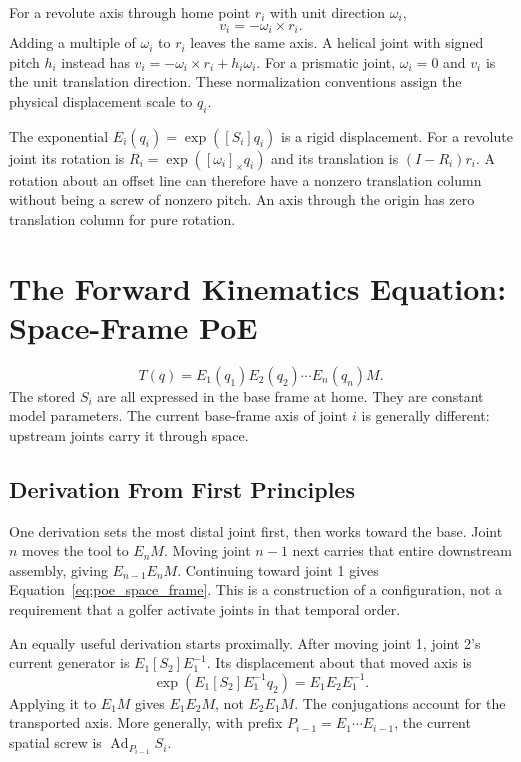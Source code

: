 For a revolute axis through home point $r_i$ with unit direction $\omega_i$,
\begin{equation}
 v_i=-\omega_i\times r_i.
\end{equation}
Adding a multiple of $\omega_i$ to $r_i$ leaves the same axis. A helical joint with signed pitch $h_i$ instead has $v_i=-\omega_i\times r_i+h_i\omega_i$. For a prismatic joint, $\omega_i=0$ and $v_i$ is the unit translation direction. These normalization conventions assign the physical displacement scale to $q_i$.

The exponential $E_i(q_i)=\exp([S_i]q_i)$ is a rigid displacement. For a revolute joint its rotation is $R_i=\exp([\omega_i]_\times q_i)$ and its translation is $(I-R_i)r_i$. A rotation about an offset line can therefore have a nonzero translation column without being a screw of nonzero pitch. An axis through the origin has zero translation column for pure rotation.

\section[The Forward Kinematics Equation: Space-Frame PoE]{The Forward Kinematics Equation:\\Space-Frame PoE}
\label{sec:poe_formula}
\begin{equation}
 \label{eq:poe_space_frame}
 T(q)=E_1(q_1)E_2(q_2)\cdots E_n(q_n)M.
\end{equation}
The stored $S_i$ are all expressed in the base frame at home. They are constant model parameters. The current base-frame axis of joint $i$ is generally different: upstream joints carry it through space.

\subsection{Derivation From First Principles}
\label{subsec:poe_derivation}

One derivation sets the most distal joint first, then works toward the base. Joint $n$ moves the tool to $E_nM$. Moving joint $n-1$ next carries that entire downstream assembly, giving $E_{n-1}E_nM$. Continuing toward joint 1 gives Equation~\ref{eq:poe_space_frame}. This is a construction of a configuration, not a requirement that a golfer activate joints in that temporal order.

An equally useful derivation starts proximally. After moving joint 1, joint 2's current generator is $E_1[S_2]E_1^{-1}$. Its displacement about that moved axis is
\begin{equation}
 \exp(E_1[S_2]E_1^{-1}q_2)=E_1E_2E_1^{-1}.
\end{equation}
Applying it to $E_1M$ gives $E_1E_2M$, not $E_2E_1M$. The conjugations account for the transported axis. More generally, with prefix $P_{i-1}=E_1\cdots E_{i-1}$, the current spatial screw is $\operatorname{Ad}_{P_{i-1}}S_i$.

